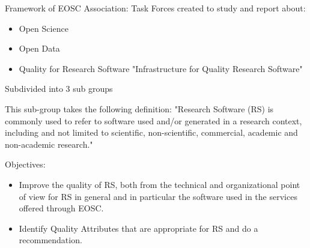 Framework of EOSC Association:
Task Forces created to study and report about:

\begin{itemize}
    \item Open Science
    \item Open Data
    \item Quality for Research Software "Infrastructure for Quality Research Software"
\end{itemize}

Subdivided into 3 sub groups

This sub-group takes the following definition: "Research Software (RS) is commonly used to refer to software used and/or generated in a research context, including and not limited to scientific, non-scientific, commercial, academic and non-academic research."~\cite{gruenpeter_defining_2021}

Objectives:

\begin{itemize}
    \item Improve the quality of RS, both from the technical and organizational point of view for RS in general and in particular the software used in the services offered through EOSC.
    \item Identify Quality Attributes that are appropriate for RS and do a recommendation.
\end{itemize}

